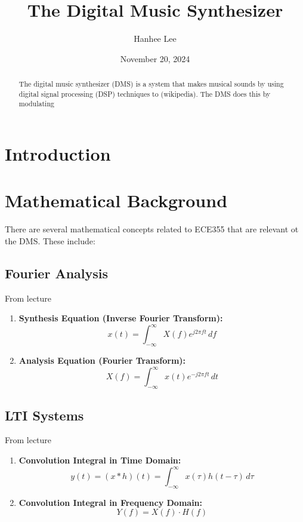 \documentclass[12pt]{article}
\title{\textbf{The Digital Music Synthesizer}}
\author{Hanhee Lee}
\date{November 20, 2024}
\begin{document}
\maketitle
\begin{abstract}
The digital music synthesizer (DMS) is a system that makes musical sounds by using digital signal processing (DSP) techniques to (wikipedia). 
The DMS does this by modulating 
\end{abstract} 

\section{Introduction}

\section{Mathematical Background}
There are several mathematical concepts related to ECE355 that are relevant ot the DMS. These include: 


\subsection{Fourier Analysis}
From lecture
\begin{enumerate}
    \item \textbf{Synthesis Equation (Inverse Fourier Transform):}
    \begin{equation}
        x(t) = \int_{-\infty}^{\infty} X(f) e^{j 2 \pi f t} \, df
    \end{equation}

    \item \textbf{Analysis Equation (Fourier Transform):}
    \begin{equation}
        X(f) = \int_{-\infty}^{\infty} x(t) e^{-j 2 \pi f t} \, dt
    \end{equation}

\end{enumerate}

\subsection{LTI Systems}
From lecture
\begin{enumerate}
    \item \textbf{Convolution Integral in Time Domain:}
    \begin{equation}
        y(t) = (x * h)(t) = \int_{-\infty}^{\infty} x(\tau) h(t - \tau) \, d\tau 
    \end{equation}
    \item \textbf{Convolution Integral in Frequency Domain:}
    \begin{equation}
        Y(f) = X(f) \cdot H(f)
    \end{equation}
\end{enumerate}
\end{document}
